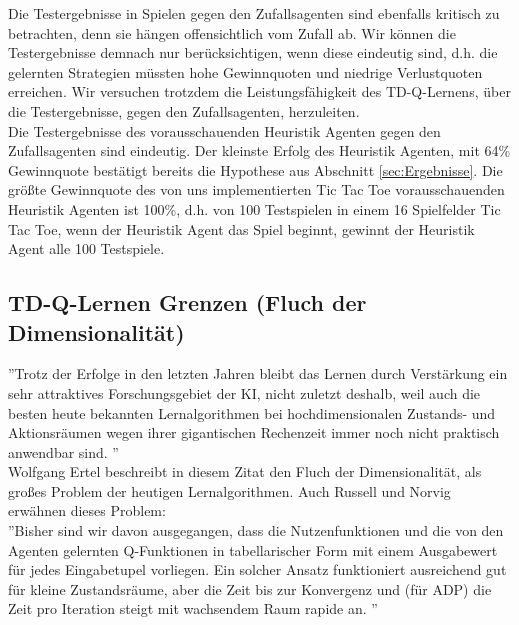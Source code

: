 Die Testergebnisse in Spielen gegen den Zufallsagenten sind ebenfalls kritisch zu betrachten, denn sie hängen offensichtlich vom Zufall ab. Wir können die Testergebnisse demnach nur berücksichtigen, wenn diese eindeutig sind, d.h. die gelernten Strategien müssten hohe Gewinnquoten und niedrige Verlustquoten erreichen. Wir versuchen trotzdem die Leistungsfähigkeit des TD-Q-Lernens, über die Testergebnisse, gegen den Zufallsagenten, herzuleiten. \\ 


Die Testergebnisse des vorausschauenden Heuristik Agenten gegen den Zufallsagenten sind eindeutig. Der kleinste Erfolg des Heuristik Agenten, mit 64\% Gewinnquote bestätigt bereits die Hypothese aus Abschnitt \ref{sec:Ergebnisse}. Die größte Gewinnquote des von uns implementierten Tic Tac Toe vorausschauenden Heuristik Agenten ist 100\%, d.h. von 100 Testspielen in einem 16 Spielfelder Tic Tac Toe, wenn der Heuristik Agent das Spiel beginnt, gewinnt der Heuristik Agent alle 100 Testspiele. \\


\subsection{TD-Q-Lernen Grenzen (Fluch der Dimensionalität)}
\label{subsec:TD-Q-Lernen Grenzen}
''Trotz der Erfolge in den letzten Jahren bleibt das Lernen durch Verstärkung ein sehr attraktives Forschungsgebiet der KI, nicht zuletzt deshalb, weil auch die besten heute bekannten Lernalgorithmen bei hochdimensionalen Zustands- und Aktionsräumen wegen ihrer gigantischen Rechenzeit immer noch nicht praktisch anwendbar sind. \cite[305]{Ertel}''\\

Wolfgang Ertel beschreibt in diesem Zitat den Fluch der Dimensionalität, als großes Problem der heutigen Lernalgorithmen. Auch Russell und Norvig erwähnen dieses Problem:\\

''Bisher sind wir davon ausgegangen, dass die Nutzenfunktionen und die von den Agenten gelernten Q-Funktionen in tabellarischer Form mit einem Ausgabewert für jedes Eingabetupel vorliegen. Ein solcher Ansatz funktioniert ausreichend gut für kleine Zustandsräume, aber die Zeit bis zur Konvergenz und (für ADP) die Zeit pro Iteration steigt mit wachsendem Raum rapide an. \cite[975]{Russell}''\\

